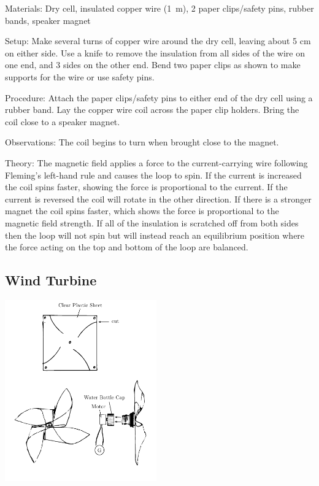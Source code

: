 \begin{multicols}{2}
\begin{description*}
\item[Materials:]{Dry cell, insulated copper wire (1~m), 2 paper clips/safety pins, rubber bands, speaker magnet}
\item[Setup:]{Make several turns of copper wire around the dry cell, leaving about 5 cm on either side. Use a knife to remove the insulation from all sides of the wire on one end, and 3 sides on the other end. Bend two paper clips as shown to make supports for the wire or use safety pins.}
\item[Procedure:]{Attach the paper clips/safety pins to either end of the dry cell using a rubber band. Lay the copper wire coil across the paper clip holders. Bring the coil close to a speaker magnet.}
\item[Observations:]{The coil begins to turn when brought close to the magnet.}
\item[Theory:]{The magnetic field applies a force to the current-carrying wire following Fleming's left-hand rule and causes the loop to spin. If the current is increased the coil spins faster, showing the force is proportional to the current. If the current is reversed the coil will rotate in the other direction. If there is a stronger magnet the coil spins faster, which shows the force is proportional to the magnetic field strength. If all of the insulation is scratched off from both sides then the loop will not spin but will instead reach an equilibrium position where the force acting on the top and bottom of the loop are balanced.}
\end{description*}

\columnbreak

\subsection{Wind Turbine}
\label{sub:wind-turbine}

\begin{center}
\includegraphics[width=0.49\textwidth]{./img/wind-turbine.png}
\end{center}


\end{multicols}
